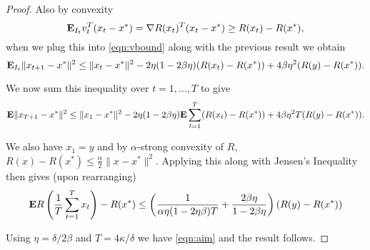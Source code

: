 \begin{theorem}
\begin{proof}
Also by convexity
\begin{equation*}
	\mathbf{E}_{I_t} v_t^T(x_t - x^*) = \nabla R(x_t)^T(x_t - x^*) \ge R(x_t) - R(x^*),
\end{equation*}
when we plug this into \eqref{eqn:vbound} along with the previous result we obtain
\begin{equation*}
	\mathbf{E}_{I_t} \|x_{t+1} - x^*\|^2 \le \|x_t-x^*\|^2 - 2\eta (1 - 2\beta \eta)(R(x_t) - R(x^*))+ 4\beta \eta^2 (R(y) - R(x^*)).
\end{equation*}

We now sum this inequality over $t=1, ..., T$ to give
\begin{equation*}
	\mathbf{E} \|x_{T+1} - x^*\|^2 \le \|x_1-x^*\|^2 - 2\eta (1 - 2\beta \eta) \mathbf{E} \sum_{t=1}^T(R(x_t) - R(x^*))+ 4\beta \eta^2 T(R(y) - R(x^*)).
\end{equation*}

We also have $x_1= y$ and by $\alpha$-strong convexity of $R$, $R(x) - R(x^*) \le \frac{\alpha}{2}\|x - x^*\|^2$. Applying this along with Jensen's Inequality  then gives (upon rearranging)
\begin{equation*}
	\mathbf{E} R\left(\frac{1}{T}\sum_{t=1}^T x_t \right) - R(x^*)  \le  \left(\frac{1}{\alpha \eta (1 - 2\eta \beta)T} + \frac{2\beta \eta}{1 - 2\beta \eta} \right)(R(y) - R(x^*))
\end{equation*}

Using $\eta = \delta/2\beta$ and $T = 4\kappa/\delta$ we have \eqref{eqn:aim} and the result follows.

\end{proof}

\end{theorem}
